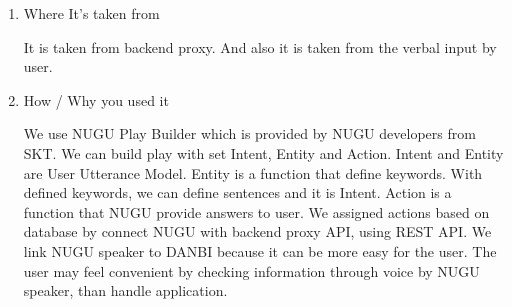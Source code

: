 \documentclass[conference]{IEEEtran}
\begin{document}
\begin{itemize}
\begin{enumerate}
        \item Where It's taken from
        
        It is taken from backend proxy. And also it is taken from the verbal input by user.
        \item How / Why you used it
        
        We use NUGU Play Builder which is provided by NUGU developers from SKT. We can build play with set Intent, Entity and Action. Intent and Entity are User Utterance Model. Entity is a function that define keywords. With defined keywords, we can define sentences and it is Intent. Action is a function that NUGU provide answers to user. We assigned actions based on database by connect NUGU with backend proxy API, using REST API. We link NUGU speaker to DANBI because it can be more easy for the user. The user may feel  convenient by checking information through voice by NUGU speaker, than handle application.
    \end{enumerate}
\end{itemize}
\end{document}
